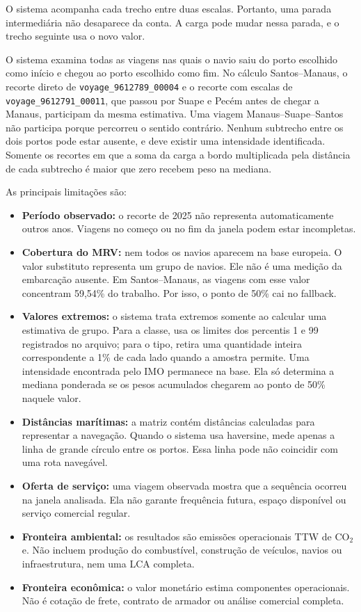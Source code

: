 \documentclass[12pt,a4paper]{article}
\newcommand{\cooe}{CO$_2$e}
\newcommand{\ttw}{TTW}
\begin{document}
O sistema acompanha cada trecho entre duas escalas. Portanto, uma parada intermediária não desaparece da conta. A carga pode mudar nessa parada, e o trecho seguinte usa o novo valor.

O sistema examina todas as viagens nas quais o navio saiu do porto escolhido como início e chegou ao porto escolhido como fim. No cálculo Santos--Manaus, o recorte direto de \texttt{voyage\_9612789\_00004} e o recorte com escalas de \texttt{voyage\_9612791\_00011}, que passou por Suape e Pecém antes de chegar a Manaus, participam da mesma estimativa. Uma viagem Manaus--Suape--Santos não participa porque percorreu o sentido contrário. Nenhum subtrecho entre os dois portos pode estar ausente, e deve existir uma intensidade identificada. Somente os recortes em que a soma da carga a bordo multiplicada pela distância de cada subtrecho é maior que zero recebem peso na mediana.

As principais limitações são:

\begin{itemize}
  \item \textbf{Período observado:} o recorte de 2025 não representa automaticamente outros anos. Viagens no começo ou no fim da janela podem estar incompletas.
  \item \textbf{Cobertura do MRV:} nem todos os navios aparecem na base europeia. O valor substituto representa um grupo de navios. Ele não é uma medição da embarcação ausente. Em Santos--Manaus, as viagens com esse valor concentram 59,54\% do trabalho. Por isso, o ponto de 50\% cai no fallback.
  \item \textbf{Valores extremos:} o sistema trata extremos somente ao calcular uma estimativa de grupo. Para a classe, usa os limites dos percentis 1 e 99 registrados no arquivo; para o tipo, retira uma quantidade inteira correspondente a 1\% de cada lado quando a amostra permite. Uma intensidade encontrada pelo IMO permanece na base. Ela só determina a mediana ponderada se os pesos acumulados chegarem ao ponto de 50\% naquele valor.
  \item \textbf{Distâncias marítimas:} a matriz contém distâncias calculadas para representar a navegação. Quando o sistema usa haversine, mede apenas a linha de grande círculo entre os portos. Essa linha pode não coincidir com uma rota navegável.
  \item \textbf{Oferta de serviço:} uma viagem observada mostra que a sequência ocorreu na janela analisada. Ela não garante frequência futura, espaço disponível ou serviço comercial regular.
  \item \textbf{Fronteira ambiental:} os resultados são emissões operacionais \ttw{} de \cooe{}. Não incluem produção do combustível, construção de veículos, navios ou infraestrutura, nem uma LCA completa.
  \item \textbf{Fronteira econômica:} o valor monetário estima componentes operacionais. Não é cotação de frete, contrato de armador ou análise comercial completa.
\end{itemize}
\end{document}
